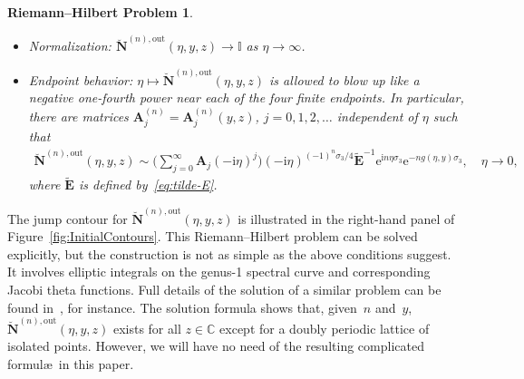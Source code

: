 \documentclass[pdftex]{sigma}
\numberwithin{equation}{section}
\newtheorem{rhp}[Theorem]{Riemann--Hilbert Problem}
 { \theoremstyle{definition}
\newtheorem{Definition}[Theorem]{Definition}
\newtheorem{Note}[Theorem]{Note}
\newtheorem{Example}[Theorem]{Example}
\newtheorem{Remark}[Theorem]{Remark} }
\begin{document}
\begin{rhp}
\begin{itemize}
\begin{gather}
 \eta\in\Sigma_{0,1}, \nonumber \\
 \breve{\mathbf{N}}^{(n),\mathrm{out}}_+(\eta,y,z)=\breve{\mathbf{N}}^{(n),\mathrm{out}}_-(\eta,y,z)\mathrm{e}^{z(-\mathrm{i}\eta)^{-1/2}\sigma_3}\mathrm{e}^{-\mathrm{i} n\kappa(y)\sigma_3}\mathrm{e}^{-z(-\mathrm{i}\eta)^{-1/2}\sigma_3},\qquad\eta\in\Sigma_0^+, \nonumber \\
 \breve{\mathbf{N}}^{(n),\mathrm{out}}_+(\eta,y,z) \nonumber \\
 \qquad=\breve{\mathbf{N}}^{(n),\mathrm{out}}_-(\eta,y,z)\mathrm{e}^{z(-\mathrm{i}\eta)^{-1/2}\sigma_3}\begin{bmatrix}0 & \mathrm{i}\mathrm{e}^{\mathrm{i} n\psi(y)}\\\mathrm{i}\mathrm{e}^{-\mathrm{i} n\psi(y)} & 0\end{bmatrix}\mathrm{e}^{-z(-\mathrm{i}\eta)^{-1/2}\sigma_3},\qquad \eta\in\Sigma_{2,3}, \nonumber \\
 \breve{\mathbf{N}}^{(n),\mathrm{out}}_+(\eta,y,z)=\breve{\mathbf{N}}^{(n),\mathrm{out}}_-(\eta,y,z)
\mathrm{e}^{z(-\mathrm{i}\eta)_-^{-1/2}\sigma_3}\mathrm{e}^{-z(-\mathrm{i}\eta)_+^{-1/2}\sigma_3},\qquad\eta\in\Sigma_\infty^-.
\label{eq:outer-parametrix-unbounded-jump}
\end{gather}
\item[]Normalization: $\breve{\mathbf{N}}^{(n),\mathrm{out}}(\eta,y,z)\to\mathbb{I}$ as $\eta\to\infty$.
\item[]Endpoint behavior: $\eta\mapsto\breve{\mathbf{N}}^{(n),\mathrm{out}}(\eta,y,z)$ is allowed to blow up like a negative one-fourth power near each of the four finite endpoints. In particular, there are matrices $\mathbf{A}^{(n)}_j=\mathbf{A}^{(n)}_j(y,z)$, $j=0,1,2,\dots$ independent of $\eta$ such that
\begin{gather}
\breve{\mathbf{N}}^{(n),\mathrm{out}}(\eta,y,z)\sim \!\Bigg(\sum_{j=0}^\infty \mathbf{A}_j(-\mathrm{i}\eta)^j\Bigg)\!(-\mathrm{i}\eta)^{(-1)^n\sigma_3/4}\widetilde{\mathbf{E}}^{-1}\mathrm{e}^{\mathrm{i} n\eta\sigma_3}\mathrm{e}^{-ng(\eta,y)\sigma_3},\quad\eta\to 0,
\!\label{eq:parametrix-at-0}
\end{gather}
where $\tilde{\mathbf{E}}$ is defined by~\eqref{eq:tilde-E}.
\end{itemize}
\end{rhp}

The jump contour for $\breve{\mathbf{N}}^{(n),\mathrm{out}}(\eta,y,z)$ is illustrated in the right-hand panel of Figure~\ref{fig:InitialContours}. This Riemann--Hilbert problem can be solved explicitly, but the construction is not as simple as the above conditions suggest. It involves elliptic integrals on the genus-1 spectral curve and corresponding Jacobi theta functions. Full details of the solution of a similar problem can be found in~\cite[Section 4.4.2]{BothnerM20}, for instance. The solution formula shows that, given~$n$ and~$y$, $\breve{\mathbf{N}}^{(n),\mathrm{out}}(\eta,y,z)$ exists for all $z\in\mathbb{C}$ except for a doubly periodic lattice of isolated points. However, we will have no need of the resulting complicated formul\ae\ in this paper.
\end{document}
